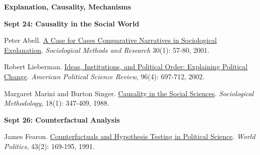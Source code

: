 \documentclass[letterpaper]{article}
\renewenvironment{itemize}{
  \begin{list}{}{
    \setlength{\leftmargin}{1.5em}
  }
}{
  \end{list}
}
\begin{document}
\begin{enumerate}
\item {\bf Explanation, Causality, Mechanisms}
		
		\begin{itemize}
		\item {\bf Sept 24: Causality in the Social World}
			\begin{itemize}
					\item[$\bullet$] Peter Abell. \href{http://journals.sagepub.com/doi/pdf/10.1177/0049124109339372}{A Case for Cases Comparative Narratives in Sociological Explanation}. \emph{Sociological Methods and Research} 30(1): 57-80, 2001. 
					\item[$\bullet$] Robert Lieberman. \href{http://www.jstor.org/stable/3117505}{Ideas, Institutions, and Political Order: Explaining Political Change}. \emph{American Political Science Review}, 96(4): 697-712, 2002. 
					\item[$\bullet$] Margaret Marini and Burton Singer. \href{http://www.jstor.org/stable/271053}{Causality in the Social Sciences}. \emph{Sociological Methodology}, 18(1): 347-409, 1988.
			\end{itemize}
		\end{itemize}



		\begin{itemize}
		\item {\bf Sept 26: Counterfactual Analysis}
			\begin{itemize}
				\item[$\bullet$] James Fearon. \href{http://www.jstor.org/stable/2010470}{Counterfactuals and Hypothesis Testing in Political Science}. \emph{World Politics}, 43(2): 169-195, 1991.
			\end{itemize}
		\end{itemize}










\end{enumerate}
\end{document}
